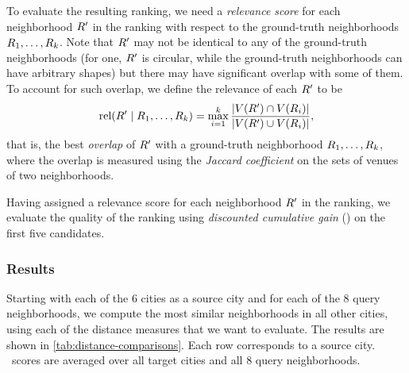 To evaluate the resulting ranking, we need a 
\emph{relevance score} for each neighborhood ${R}'$ in the ranking
with respect to the ground-truth neighborhoods
${R}_1,\ldots,{R}_k$. 
Note that ${R}'$ may not be identical to any of the ground-truth
neighbor\-hoods (for one, ${R}'$ is circular, while the ground-truth
neighbor\-hoods can have arbitrary shapes) but there may have
significant overlap with some of them. 
To account for such overlap, we define the relevance of each
${R}'$ to be
\[
{\mathrm{rel}}({R}' \mid {R}_1,\ldots,{R}_k) =
\max_{i=1}^{k}
\frac{|{V}({R}')\cap{V}({R}_i)|} {|{V}({R}')\cup{V}({R}_i)|},
\]
that is, the best \emph{overlap} of ${R}'$ with a 
ground-truth neighborhood ${R}_1,\ldots,{R}_k$, 
where the overlap is measured using the \emph{Jaccard coefficient} 
on the sets of venues of two neighborhoods.

Having assigned a relevance score for each neighborhood ${R}'$ in
the ranking, we evaluate the quality of the ranking using 
\emph{discounted cumulative gain} (\dcg) on the first five candidates.

\subsubsection{Results}
Starting with each of the 6 cities as a source city and for each of the 8 query
neighborhoods,  we compute the most similar neighborhoods in all other cities,
using each of the distance measures that we want to evaluate.  The results are
shown in \autoref{tab:distance-comparisons}.  Each row corresponds to a source
city.  \dcg\ scores are averaged over all target cities and all 8 query
neighborhoods.

